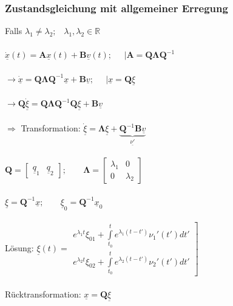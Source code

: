 \documentclass[a4paper,twocolumn,10pt]{article}
\begin{document}
\subsubsection*{Zustandsgleichung mit allgemeiner Erregung}
Falls $\lambda_1 \ne \lambda_2;\;\;\;\lambda_1,\lambda_2\in \mathbb{R}$\\\\
$\underline{\dot{x}}(t)=\textbf{A}\underline{x}(t)+\textbf{B}\underline{v}(t);\;\;\;\;\;| \textbf{A}=\textbf{Q}\mathbf{\Lambda} \textbf{Q}^{-1}$\\\\
$\rightarrow\underline{\dot{x}}=\textbf{Q}\mathbf{\Lambda} \textbf{Q}^{-1}\underline{x}+\textbf{B}\underline{v};\;\;\;\;\;|\underline{x}=\textbf{Q}\underline{\xi}$\\\\
$\rightarrow\textbf{Q}\underline{\dot\xi}=\textbf{Q}\mathbf{\Lambda} \textbf{Q}^{-1}\textbf{Q}\underline{\xi}+\textbf{B}\underline{v}$\\\\
$\Rightarrow$ Transformation: $\underline{\dot{\xi}} =\mathbf{\Lambda}\underline{\xi}+\underbrace{\textbf{Q}^{-1}\textbf{B}\underline{v}}_{\underline{\nu'}}$\\\\
$\textbf{Q}=\begin{bmatrix}\underline{q}_1 & \underline{q}_2\end{bmatrix};\;\;\;\;\;\;\;\mathbf{\Lambda} =\begin{bmatrix}\lambda_1 & 0 \\ 0 & \lambda_2\end{bmatrix}$\\\\
$\underline{\xi} =\textbf{Q}^{-1}\underline{x};\;\;\;\;\;\;\;\underline{\xi}_0 =\textbf{Q}^{-1}\underline{x}_0$\\\\
Lösung: $\underline{\xi} (t)=\left.\begin{matrix}e^{\lambda_1 t}\xi_{01}+\int\limits_{t_0}^{t}e^{\lambda_1(t-t')}\nu_1'(t')dt' \\ e^{\lambda_2 t}\xi_{02}+\int\limits_{t_0}^{t}e^{\lambda_2(t-t')}\nu_2'(t')dt'\end{matrix}\right]$\\\\
Rücktransformation: $\underline{x}=\textbf{Q}\underline{\xi}$\\
\end{document}
